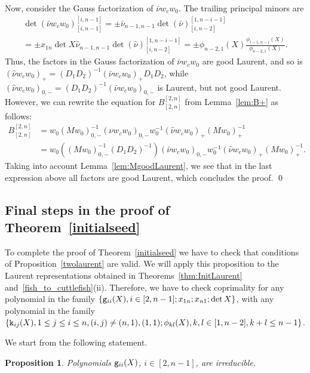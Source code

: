 \documentclass{amsart}
\newtheorem{proposition}[theorem]{Proposition}
\theoremstyle{definition}
\theoremstyle{remark}
\numberwithin{equation}{section}
\numberwithin{theorem}{section}
\def\eg{{\tt g}}
\def\ek{{\tt k}}
\begin{document}
Now, consider the Gauss factorization of $\bar \nu w_c w_0$. The trailing principal minors are
\begin{multline*}
\det(\bar \nu w_c w_0)_{[i,n-1]}^{[i,n-1]} =\pm \bar \nu_{n-1,n-1} \det(\bar \nu)_{[i,n-2]}^{[1,n-i-1]}\\
= \pm x_{1n}\det X \hat\nu_{n-1,n-1} \det(\hat\nu)_{[i,n-2]}^{[1,n-i-1]}
= \pm \phi_{n-2,1}(X)  \frac{\phi_{i-1,n-i}(X)}{\phi_{n-2,1}(X)}.
\end{multline*}
Thus, the factors in the Gauss factorization of $\bar \nu w_c w_0$ are good Laurent, and so is
$(\hat\nu w_c w_0)_+ = (D_1 D_2)^{-1} (\bar\nu w_c w_0)_+ D_1 D_2$, while
 $(\hat\nu w_c w_0)_{0,-} = (D_1 D_2)^{-1} (\bar \nu w_c w_0)_{0,-}$ is Laurent, but not good Laurent. However, we can rewrite the equation for $B_{[2,n]}^{[2,n]}$ from Lemma~\ref{lem:B+} as follows:
 \begin{align*}
 B_{[2,n]}^{[2,n]}&= w_0 (M w_0)^{-1}_{0,-} (\hat\nu w_cw_0)_{0,-} w_0^{-1} (\hat\nu w_cw_0)_+(M w_0)_+^{-1}\\
 &= w_0 \left((M w_0)^{-1}_{0,-} (D_1 D_2)^{-1}\right )  (\bar \nu w_cw_0)_{0,-} w_0^{-1} (\hat\nu w_cw_0)_+(M w_0)_+^{-1}.
 \end{align*}
 Taking into account Lemma~\ref{lem:MgoodLaurent}, we see that in the last expression above all factors are good Laurent, which concludes the proof. \qed

\subsection{Final steps in the proof of Theorem~\ref{initialseed}} To complete the proof of Theorem~\ref{initialseed} we have to check that conditions of Proposition~\ref{twolaurent} are valid. We will apply this proposition to the Laurent representations obtained in Theorems~\ref{thm:InitLaurent} and~\ref{fish_to_cuttlefish}(ii). Therefore, we have to check 
coprimality for any polynomial in the family $\left\{\eg_{ii}(X), i\in[2,n-1]; x_{1n}; x_{n1}; \det X\right\}$, with any 
polynomial in the family 
$\left\{\ek_{ij}(X), 1\le j\le i\le n, (i,j)\ne (n,1), (1,1); \phi_{kl}(X), k,l\in[1,n-2], k+l\le n-1\right\}$.

We start from the following statement.

\begin{proposition}\label{giiirr}
Polynomials $\eg_{ii}(X)$, $i\in[2,n-1]$, are irreducible.
\end{proposition}
\end{document}
